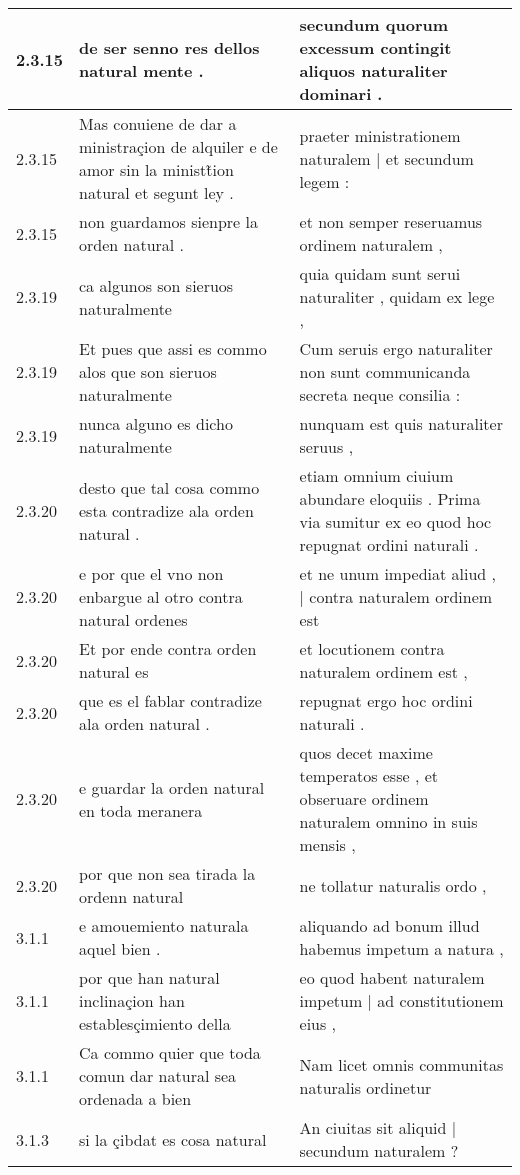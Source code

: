 \begin{tabular}{|p{1cm}|p{6.5cm}|p{6.5cm}|}
2.3.15 & de ser senno res dellos natural mente . & secundum quorum excessum contingit aliquos naturaliter dominari . \\\hline
2.3.15 & Mas conuiene de dar a ministraçion de alquiler e de amor sin la ministt̃ion natural et segunt ley . & praeter ministrationem naturalem | et secundum legem : \\\hline
2.3.15 & non guardamos sienpre la orden natural . & et non semper reseruamus ordinem naturalem , \\\hline
2.3.19 & ca algunos son sieruos naturalmente & quia quidam sunt serui naturaliter , quidam ex lege , \\\hline
2.3.19 & Et pues que assi es commo alos que son sieruos naturalmente & Cum seruis ergo naturaliter non sunt communicanda secreta neque consilia : \\\hline
2.3.19 & nunca alguno es dicho naturalmente & nunquam est quis naturaliter seruus , \\\hline
2.3.20 & desto que tal cosa commo esta contradize ala orden natural . & etiam omnium ciuium abundare eloquiis . Prima via sumitur ex eo quod hoc repugnat ordini naturali . \\\hline
2.3.20 & e por que el vno non enbargue al otro contra natural ordenes & et ne unum impediat aliud , | contra naturalem ordinem est \\\hline
2.3.20 & Et por ende contra orden natural es & et locutionem contra naturalem ordinem est , \\\hline
2.3.20 & que es el fablar contradize ala orden natural . & repugnat ergo hoc ordini naturali . \\\hline
2.3.20 & e guardar la orden natural en toda meranera & quos decet maxime temperatos esse , et obseruare ordinem naturalem omnino in suis mensis , \\\hline
2.3.20 & por que non sea tirada la ordenn natural & ne tollatur naturalis ordo , \\\hline
3.1.1 & e amouemiento naturala aquel bien . & aliquando ad bonum illud habemus impetum a natura , \\\hline
3.1.1 & por que han natural inclinaçion han establesçimiento della & eo quod habent naturalem impetum | ad constitutionem eius , \\\hline
3.1.1 & Ca commo quier que toda comun dar natural sea ordenada a bien & Nam licet omnis communitas naturalis ordinetur \\\hline
3.1.3 & si la çibdat es cosa natural & An ciuitas sit aliquid | secundum naturalem ? \\\hline

\end{tabular}
